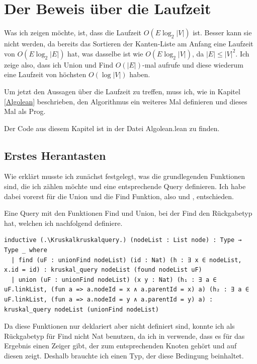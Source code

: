 \section{Der Beweis über die Laufzeit}
Was ich zeigen möchte, ist, dass die Laufzeit $O(E\log_2|V|)$ ist.
Besser kann sie nicht werden, da bereits das Sortieren der Kanten-Liste am Anfang eine Laufzeit von $O(E\log_2|E|)$ hat, was dasselbe ist wie $O(E\log_2|V|)$, da $|E| \le |V|^2$.
Ich zeige also, dass ich Union und Find $O(|E|)$-mal aufrufe und diese wiederum eine Laufzeit von höchsten $O(\log|V|)$ haben.

Um jetzt den Aussagen über die Laufzeit zu treffen, muss ich, wie in Kapitel \ref{Algolean} beschrieben, den Algorithmus ein weiteres Mal definieren und dieses Mal als Prog.

Der Code aus diesem Kapitel ist in der Datei Algolean.lean zu finden.

\subsection{Erstes Herantasten}
Wie erklärt musste ich zunächst festgelegt, was die grundlegenden Funktionen sind, die ich zählen möchte und eine entsprechende Query definieren.
Ich habe dabei vorerst für die Union und die Find Funktion, also \KruskalupdateunionFind und \KruskalconnectedcomponentofunionFindofid, entschieden.

\begin{definition}[\Kruskalkruskalquery]
  Eine Query mit den Funktionen Find und Union, bei der Find den Rückgabetyp \Kruskalfound hat, welchen ich nachfolgend definiere.
\end{definition}
\begin{lstlisting}
inductive (.\Kruskalkruskalquery.) (nodeList : List node) : Type → Type _ where
  | find (uF : unionFind nodeList) (id : Nat) (h : ∃ x ∈ nodeList, x.id = id) : kruskal_query nodeList (found nodeList uF)
  | union (uF : unionFind nodeList) (x y : Nat) (h₁ : ∃ a ∈ uF.linkList, (fun a => a.nodeId = x ∧ a.parentId = x) a) (h₂ : ∃ a ∈ uF.linkList, (fun a => a.nodeId = y ∧ a.parentId = y) a) : kruskal_query nodeList (unionFind nodeList)
\end{lstlisting}

Da diese Funktionen nur deklariert aber nicht definiert sind, konnte ich als Rückgabetyp für Find nicht Nat benutzen, da ich in \Kruskalkruskal verwende,
dass es für das Ergebnis einen Zeiger gibt, der zum entsprechenden Knoten gehört und auf diesen zeigt.
Deshalb brauchte ich einen Typ, der diese Bedingung beinhaltet.

